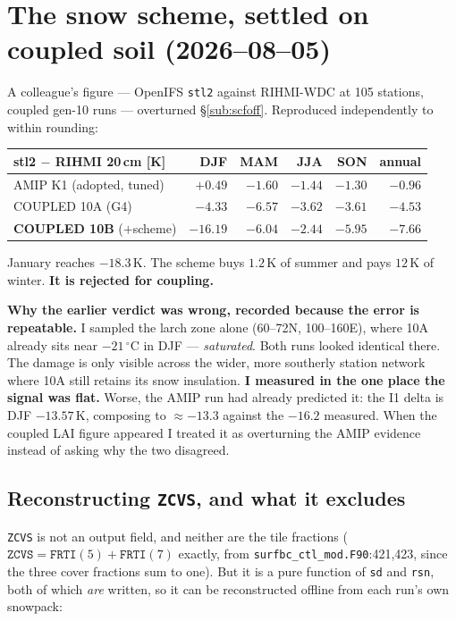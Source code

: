 \documentclass[10pt]{article}
\begin{document}
\section{The snow scheme, settled on coupled soil (2026--08--05)}\label{sub:scfcoupled}
A colleague's figure --- OpenIFS \texttt{stl2} against RIHMI-WDC at 105 stations, coupled
gen-10 runs --- overturned \S\ref{sub:scfoff}. Reproduced independently to within rounding:

\begin{center}\footnotesize
\begin{tabular}{l r r r r r}
\toprule
stl2 $-$ RIHMI 20\,cm [K] & DJF & MAM & JJA & SON & annual \\
\midrule
AMIP K1 (adopted, tuned) & $+0.49$ & $-1.60$ & $-1.44$ & $-1.30$ & $-0.96$ \\
COUPLED 10A (G4) & $-4.33$ & $\mathbf{-6.57}$ & $-3.62$ & $-3.61$ & $-4.53$ \\
\textbf{COUPLED 10B} ($+$scheme) & $\mathbf{-16.19}$ & $-6.04$ & $\mathbf{-2.44}$ & $-5.95$ & $-7.66$ \\
\bottomrule
\end{tabular}
\end{center}

\noindent January reaches $-18.3$\,K. The scheme buys $1.2$\,K of summer and pays $12$\,K of
winter. \textbf{It is rejected for coupling.}

\textbf{Why the earlier verdict was wrong, recorded because the error is repeatable.} I
sampled the larch zone alone (60--72\textdegree N, 100--160\textdegree E), where 10A already
sits near $-21\,^\circ$C in DJF --- \emph{saturated}. Both runs looked identical there. The
damage is only visible across the wider, more southerly station network where 10A still
retains its snow insulation. \textbf{I measured in the one place the signal was flat.}
Worse, the AMIP run had already predicted it: the I1 delta is DJF $-13.57$\,K, composing to
${\approx}-13.3$ against the $-16.2$ measured. When the coupled LAI figure appeared I treated
it as overturning the AMIP evidence instead of asking why the two disagreed.

\subsection{Reconstructing \texttt{ZCVS}, and what it excludes}\label{sub:zcvsrecon}
\texttt{ZCVS} is not an output field, and neither are the tile fractions
($\texttt{ZCVS}=\texttt{FRTI}(5)+\texttt{FRTI}(7)$ exactly, from
\texttt{surfbc\_ctl\_mod.F90}:421,423, since the three cover fractions sum to one). But it is
a pure function of \texttt{sd} and \texttt{rsn}, both of which \emph{are} written, so it can
be reconstructed offline from each run's own snowpack:
\end{document}
